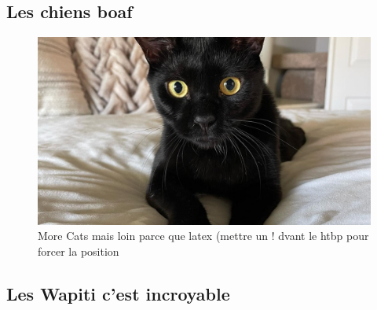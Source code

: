 \subsection{Les chiens boaf}
\lipsum[4-6]
\begin{figure}[htbp]
  \centering
  \includegraphics[width=\textwidth]{paper/figures/chat4.jpg}
  \caption{More Cats mais loin parce que latex (mettre un ! dvant le htbp pour forcer la position}
  \label{fig:chat4}
\end{figure}
\subsection{Les Wapiti c'est incroyable}
\lipsum[7-9]